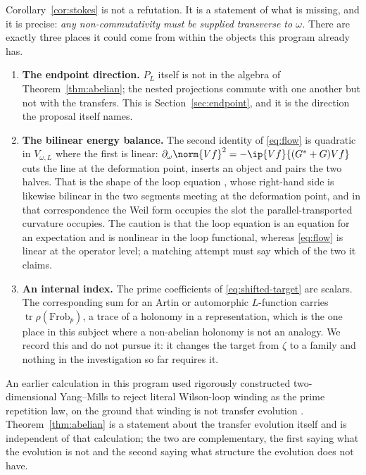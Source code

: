 \begin{remark}
\label{rem:cost}
Corollary~\ref{cor:stokes} is not a refutation. It is a statement of what is
missing, and it is precise: \emph{any non-commutativity must be supplied
transverse to $\omega$.} There are exactly three places it could come from within
the objects this program already has.

\begin{enumerate}
\item \textbf{The endpoint direction.} $P_L$ itself is not in the algebra of
Theorem~\ref{thm:abelian}; the nested projections commute with one another but
not with the transfers. This is Section~\ref{sec:endpoint}, and it is the
direction the proposal itself names.
\item \textbf{The bilinear energy balance.} The second identity of
\eqref{eq:flow} is quadratic in $V_{\omega,L}$ where the first is linear:
$\partial_\omega\norm{V f}^2=-\ip{Vf}{(G^*+G)Vf}$ cuts the line at the
deformation point, inserts an object and pairs the two halves. That is the shape
of the loop equation \cite{MM}, whose right-hand side is likewise bilinear in the
two segments meeting at the deformation point, and in that correspondence the
Weil form occupies the slot the parallel-transported curvature occupies. The
caution is that the loop equation is an equation for an expectation and is
nonlinear in the loop functional, whereas \eqref{eq:flow} is linear at the
operator level; a matching attempt must say which of the two it claims.
\item \textbf{An internal index.} The prime coefficients of
\eqref{eq:shifted-target} are scalars. The corresponding sum for an Artin or
automorphic $L$-function carries $\operatorname{tr}\rho(\mathrm{Frob}_p)$, a
trace of a holonomy in a representation, which is the one place in this subject
where a non-abelian holonomy is not an analogy. We record this and do not pursue
it: it changes the target from $\zeta$ to a family and nothing in the
investigation so far requires it.
\end{enumerate}
\end{remark}

\begin{remark}
An earlier calculation in this program used rigorously constructed
two-dimensional Yang--Mills \cite{YM2} to reject literal Wilson-loop winding as
the prime repetition law, on the ground that winding is not transfer evolution
\cite{GaugeTransfer}. Theorem~\ref{thm:abelian} is a statement about the
transfer evolution itself and is independent of that calculation; the two are
complementary, the first saying what the evolution is not and the second saying
what structure the evolution does not have.
\end{remark}
